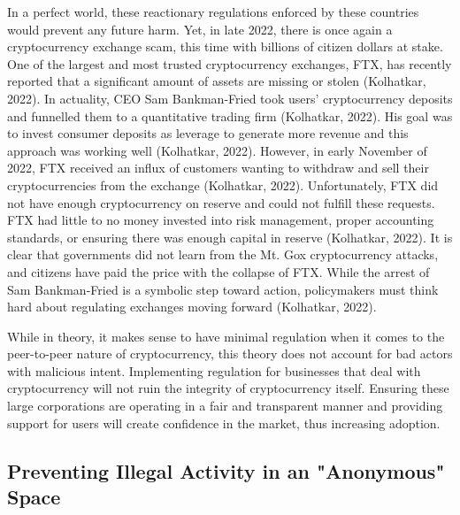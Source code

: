 \documentclass{article}
\begin{document}
\noindent \newline In a perfect world, these reactionary regulations enforced by these countries would prevent any future harm. Yet, in late 2022, there is once again a cryptocurrency exchange scam, this time with billions of citizen dollars at stake. One of the largest and most trusted cryptocurrency exchanges, FTX, has recently reported that a significant amount of assets are missing or stolen (Kolhatkar, 2022). In actuality, CEO Sam Bankman-Fried took users’ cryptocurrency deposits and funnelled them to a quantitative trading firm (Kolhatkar, 2022). His goal was to invest consumer deposits as leverage to generate more revenue and this approach was working well (Kolhatkar, 2022). However, in early November of 2022, FTX received an influx of customers wanting to withdraw and sell their cryptocurrencies from the exchange (Kolhatkar, 2022). Unfortunately, FTX did not have enough cryptocurrency on reserve and could not fulfill these requests. FTX had little to no money invested into risk management, proper accounting standards, or ensuring there was enough capital in reserve (Kolhatkar, 2022). It is clear that governments did not learn from the Mt. Gox cryptocurrency attacks, and citizens have paid the price with the collapse of FTX. While the arrest of Sam Bankman-Fried is a symbolic step toward action, policymakers must think hard about regulating exchanges moving forward (Kolhatkar, 2022).

\noindent \newline While in theory, it makes sense to have minimal regulation when it comes to the peer-to-peer nature of cryptocurrency, this theory does not account for bad actors with malicious intent. Implementing regulation for businesses that deal with cryptocurrency will not ruin the integrity of cryptocurrency itself. Ensuring these large corporations are operating in a fair and transparent manner and providing support for users will create confidence in the market, thus increasing adoption.




\subsection{Preventing Illegal Activity in an "Anonymous" Space}
\end{document}
